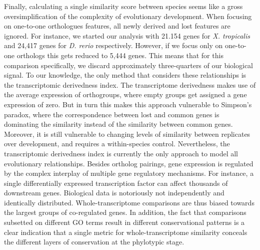 Finally, calculating a single similarity score between species seems like a gross oversimplification of the complexity of evolutionary development. When focusing on one-to-one orthologues features, all newly derived and lost features are ignored. For instance, we started our analysis with 21.154 genes for \textit{X. tropicalis} and 24,417 genes for \textit{D. rerio} respectively. However, if we focus only on one-to-one orthologs this gets reduced to 5,444 genes. This means that for this comparison specifically, we discard approximately three-quarters of our biological signal. To our knowledge, the only method that considers these relationships is the transcriptomic derivedness index\cite{Leong2021}. The transcriptome derivedness makes use of the average expression of orthogroups, where empty groups get assigned a gene expression of zero. But in turn this makes this approach vulnerable to Simpson's paradox, where the correspondence between lost and common genes is dominating the similarity instead of the similarity between common genes\cite{Saccenti2023}. Moreover, it is still vulnerable to changing levels of similarity between replicates over development, and requires a within-species control. Nevertheless, the transcriptomic derivedness index is currently the only approach to model all evolutionary relationships. Besides ortholog pairings, gene expression is regulated by the complex interplay of multiple gene regulatory mechanisms. For instance, a single differentially expressed transcription factor can affect thousands of downstream genes. Biological data is notoriously not independently and identically distributed. Whole-transcriptome comparisons are thus biased towards the largest groups of co-regulated genes. In addition, the fact that comparisons subsetted on different GO terms result in different conservational patterns is a clear indication that a single metric for whole-transcriptome similarity conceals the different layers of conservation at the phylotypic stage\cite{Malik2017,Gildor2019,Onimaru2021}.

